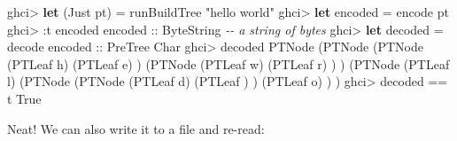 \documentclass[]{article}
\newenvironment{Shaded}{}{}
\newcommand{\CharTok}[1]{\textcolor[rgb]{0.25,0.44,0.63}{#1}}
\newcommand{\CommentTok}[1]{\textcolor[rgb]{0.38,0.63,0.69}{\textit{#1}}}
\newcommand{\DataTypeTok}[1]{\textcolor[rgb]{0.56,0.13,0.00}{#1}}
\newcommand{\KeywordTok}[1]{\textcolor[rgb]{0.00,0.44,0.13}{\textbf{#1}}}
\newcommand{\NormalTok}[1]{#1}
\newcommand{\OperatorTok}[1]{\textcolor[rgb]{0.40,0.40,0.40}{#1}}
\newcommand{\OtherTok}[1]{\textcolor[rgb]{0.00,0.44,0.13}{#1}}
\newcommand{\StringTok}[1]{\textcolor[rgb]{0.25,0.44,0.63}{#1}}
\begin{document}
\begin{Shaded}
\begin{Highlighting}[]
\NormalTok{ghci}\OperatorTok{\textgreater{}} \KeywordTok{let}\NormalTok{ (}\DataTypeTok{Just}\NormalTok{ pt) }\OtherTok{=}\NormalTok{ runBuildTree }\StringTok{"hello world"}
\NormalTok{ghci}\OperatorTok{\textgreater{}} \KeywordTok{let}\NormalTok{ encoded }\OtherTok{=}\NormalTok{ encode pt}
\NormalTok{ghci}\OperatorTok{\textgreater{}} \OperatorTok{:}\NormalTok{t encoded}
\OtherTok{encoded ::} \DataTypeTok{ByteString}       \CommentTok{{-}{-} a string of bytes}
\NormalTok{ghci}\OperatorTok{\textgreater{}} \KeywordTok{let}\NormalTok{ decoded }\OtherTok{=}\NormalTok{ decode}\OtherTok{ encoded ::} \DataTypeTok{PreTree} \DataTypeTok{Char}
\NormalTok{ghci}\OperatorTok{\textgreater{}}\NormalTok{ decoded}
\DataTypeTok{PTNode}\NormalTok{ (}\DataTypeTok{PTNode}\NormalTok{ (}\DataTypeTok{PTNode}\NormalTok{ (}\DataTypeTok{PTLeaf} \CharTok{\textquotesingle{}h\textquotesingle{}}\NormalTok{)}
\NormalTok{                       (}\DataTypeTok{PTLeaf} \CharTok{\textquotesingle{}e\textquotesingle{}}\NormalTok{)}
\NormalTok{               )}
\NormalTok{               (}\DataTypeTok{PTNode}\NormalTok{ (}\DataTypeTok{PTLeaf} \CharTok{\textquotesingle{}w\textquotesingle{}}\NormalTok{)}
\NormalTok{                       (}\DataTypeTok{PTLeaf} \CharTok{\textquotesingle{}r\textquotesingle{}}\NormalTok{)}
\NormalTok{               )}
\NormalTok{       )}
\NormalTok{       (}\DataTypeTok{PTNode}\NormalTok{ (}\DataTypeTok{PTLeaf} \CharTok{\textquotesingle{}l\textquotesingle{}}\NormalTok{)}
\NormalTok{               (}\DataTypeTok{PTNode}\NormalTok{ (}\DataTypeTok{PTNode}\NormalTok{ (}\DataTypeTok{PTLeaf} \CharTok{\textquotesingle{}d\textquotesingle{}}\NormalTok{)}
\NormalTok{                               (}\DataTypeTok{PTLeaf} \CharTok{\textquotesingle{} \textquotesingle{}}\NormalTok{)}
\NormalTok{                       )}
\NormalTok{                       (}\DataTypeTok{PTLeaf} \CharTok{\textquotesingle{}o\textquotesingle{}}\NormalTok{)}
\NormalTok{               )}
\NormalTok{       )}
\NormalTok{ghci}\OperatorTok{\textgreater{}}\NormalTok{ decoded }\OperatorTok{==}\NormalTok{ t}
\DataTypeTok{True}
\end{Highlighting}
\end{Shaded}

Neat! We can also write it to a file and re-read:
\end{document}
